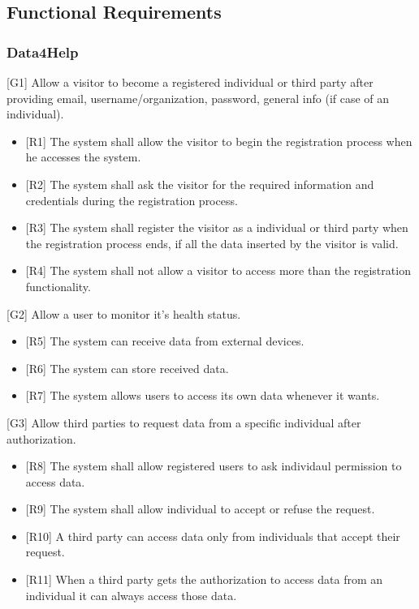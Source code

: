 \documentclass[12pt]{article}
\begin{document}
\subsection{Functional Requirements}
\subsubsection{Data4Help}
[G1] Allow a visitor to become a registered individual or third party after providing email, username/organization, password, general info (if case of an individual). \newline
\begin{itemize}
    \item{[R1]} The system shall allow the visitor to begin the registration process when he accesses the system.
    \item{[R2]} The system shall ask the visitor for the required information and credentials during the registration process.
    \item{[R3]} The system shall register the visitor as a individual or third party when the registration process ends, if all the data inserted by the visitor is valid.
    \item{[R4]} The system shall not allow a visitor to access more than the registration functionality.
\end{itemize}
[G2] Allow a user to monitor it's health status.\newline 
\begin{itemize}
    \item {[R5]} The system can receive data from external devices. 
    \item {[R6]} The system can store received data. 
    \item {[R7]} The system allows users to access its own data whenever it wants.
\end{itemize}
[G3] Allow third parties to request data from a specific individual after authorization.\newline 
\begin{itemize}
    \item {[R8]} The system shall allow registered users to ask individaul permission to access data.
    \item {[R9]} The system shall allow individual to accept or refuse the request. 
    \item {[R10]} A third party can access data only from individuals that accept their request.
    \item {[R11]} When a third party gets the authorization to access data from an individual it can always access those data. 
\end{itemize}
\end{document}
